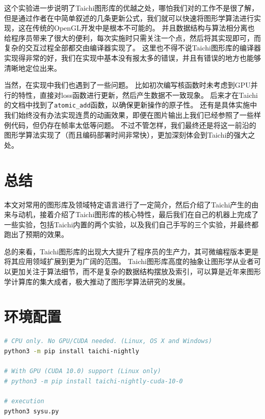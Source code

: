 \documentclass[thesis]{thesis}
\begin{document}
这个实验进一步说明了Taichi图形库的优越之处，哪怕我们对\cite{wang:wave_2018}的工作不是很了解，但是通过作者在\cite{hu_difftaichi_2019}中简单叙述的几条更新公式，我们就可以快速将图形学算法进行实现，这在传统的OpenGL开发中是根本不可能的。
并且数据结构与算法相分离也给程序员带来了很大的便利，每次实施时只需关注一个点，然后将其实现即可，而复杂的交互过程全部都交由编译器实现了。
这里也不得不说Taichi图形库的编译器实现得非常的好，我们在实现中基本没有报太多的错误，并且有错误的地方也能够清晰地定位出来。

当然，在实现中我们也遇到了一些问题。
比如初次编写核函数时未考虑到GPU并行的特性，直接对loss函数进行更新，然后产生数据不一致现象。
后来才在Taichi的文档中找到了\verb'atomic_add'函数，以确保更新操作的原子性。
还有是具体实施中我们始终没有办法实现\cite{hu_difftaichi_2019}连贯的动画效果，即便在图片输出上我们已经参照了一些样例代码，但仍存在帧率太低等问题。
不过不管怎样，我们最终还是将这一前沿的图形学算法实现了（而且编码部署时间非常快），更加深刻体会到Taichi的强大之处。

\section{总结}
\label{sec:summary}
本文对常用的图形库及领域特定语言进行了一定简介，然后介绍了Taichi产生的由来与动机，接着介绍了Taichi图形库的核心特性，最后我们在自己的机器上完成了一些实验，包括Taichi内置的两个实验，以及我们自己手写的三个实验，并最终都跑出了预期的效果。

总的来看，Taichi图形库的出现大大提升了程序员的生产力，其可微编程版本更是将其应用领域扩展到更为广阔的范围。
Taichi图形库高度的抽象让图形学从业者可以更加关注于算法细节，而不是复杂的数据结构摆放及索引，可以算是近年来图形学计算库的集大成者，极大推动了图形学算法研究的发展。




\newpage
\appendix
\appendixconfig
\section{环境配置}
\label{appendix:env}
\begin{lstlisting}[language=bash]
# CPU only. No GPU/CUDA needed. (Linux, OS X and Windows)
python3 -m pip install taichi-nightly

# With GPU (CUDA 10.0) support (Linux only)
# python3 -m pip install taichi-nightly-cuda-10-0

# execution
python3 sysu.py
\end{lstlisting}
\end{document}
